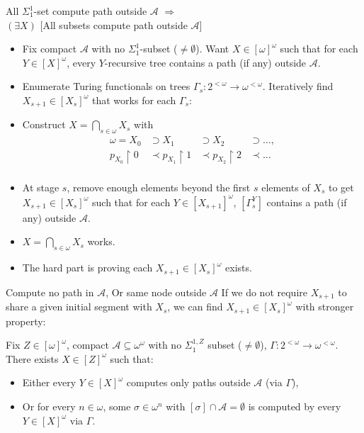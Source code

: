 \begin{frame}{All $\Sigma_1^1$-set compute path outside $\mathcal{A}$
$\Rightarrow$\\ $(\exists X)$ {[All subsets compute path outside
$\mathcal{A}$]}}
  \begin{itemize}
    \item Fix compact $\mathcal{A}$ with no $\Sigma_1^1$-subset
      ($\neq\emptyset$). Want $X\in[\omega]^\omega$ such that for each
      $Y\in[X]^\omega$, every $Y$-recursive tree contains a path (if any)
      outside $\mathcal{A}$.
    \item Enumerate Turing functionals on trees
      $\Gamma_s:2^{<\omega} \rightarrow \omega^{<\omega}$. Iteratively
      find $X_{s+1}\in[X_s]^\omega$ that works for each $\Gamma_s$:
    \item Construct $X=\bigcap_{s\in\omega}X_s$ with
      \[\begin{array}{rlll}
        \omega=X_0 &\supset X_1 &\supset X_2 &\supset\ldots,\\
        p_{X_0}\restriction0 &\prec p_{X_1}\restriction1 &\prec
          p_{X_2}\restriction2 &\prec\ldots\\
      \end{array}\]
    \item At stage $s$, remove enough elements beyond the first $s$
      elements of $X_s$ to get $X_{s+1}\in[X_s]^\omega$ such that for each
      $Y\in[X_{s+1}]^\omega$, $[\Gamma_s^Y]$
      contains a path (if any) outside $\mathcal{A}$.
    \item $X=\bigcap_{s\in\omega}X_s$ works.
    \item The hard part is proving each $X_{s+1}\in[X_s]^\omega$ exists.
  \end{itemize}
\end{frame}

\begin{frame}{Compute no path in $\mathcal{A}$, Or same node outside
$\mathcal{A}$}
  If we do not require $X_{s+1}$ to share a given initial segment with
  $X_s$, we can find $X_{s+1}\in[X_s]^\omega$ with stronger property:

  \begin{lemma}
  \label{lemma:all-outside-A}
    Fix $Z\in[\omega]^\omega$, compact
    $\mathcal{A}\subseteq\omega^\omega$ with no $\Sigma_1^{1,Z}$ subset
    ($\neq\emptyset$), $\Gamma:2^{<\omega} \rightarrow
    \omega^{<\omega}$. There exists $X\in[Z]^\omega$ such that:

    \begin{itemize}
      \item Either every $Y\in[X]^\omega$ computes only paths outside
        $\mathcal{A}$ (via $\Gamma$),
      \item Or for every $n\in\omega$, some $\sigma\in\omega^n$ with
        $[\sigma]\cap\mathcal{A}=\emptyset$ is computed by every
        $Y\in[X]^\omega$ via $\Gamma$.
    \end{itemize}
  \end{lemma}
\end{frame}

